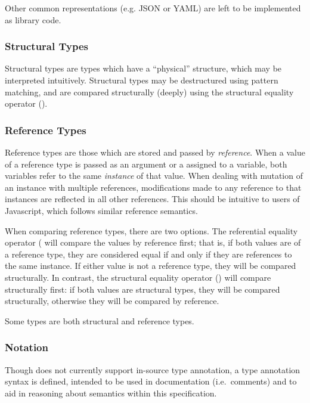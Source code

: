 Other common representations (e.g. JSON or YAML) are left
to be implemented as library code.

\subsubsection{Structural Types}
\label{sec:structuraltypes}

Structural types are types which have a ``physical'' structure, which may be
interpreted intuitively. Structural types may be destructured using pattern
matching, and are compared structurally (deeply) using the structural equality
operator (\op{==}).

\subsubsection{Reference Types}
\label{sec:referencetypes}

Reference types are those which are stored and passed by \emph{reference}. When
a value of a reference type is passed as an argument or a assigned to a variable, both
variables refer to the same \emph{instance} of that value. When dealing with
mutation of an instance with multiple references, modifications made to any
reference to that instances are reflected in all other references. This should be
intuitive to users of Javascript, which follows similar reference semantics.

When comparing reference types, there are two options. The referential equality
operator (\op{===)} will compare the values by reference first; that is, if
both values are of a reference type, they are considered equal if and only
if they are references to the same instance. If either value is not a reference
type, they will be compared structurally. In contrast, the structural equality
operator (\op{==}) will compare structurally first: if both values are structural
types, they will be compared structurally, otherwise they will be compared by
reference.

Some types are both structural and reference types.

\subsubsection{Notation}

Though \Trilogy{} does not currently support in-source type annotation, a
type annotation syntax is defined, intended to be used in documentation
(i.e.\ comments) and to aid in reasoning about semantics within this specification.

